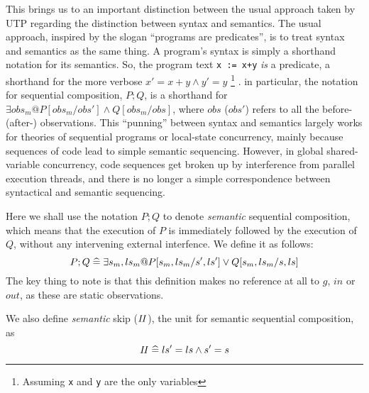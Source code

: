 This brings us to an important distinction between the usual approach
taken by UTP regarding the distinction between syntax and semantics.
The usual approach,
inspired by the slogan ``programs are predicates''\cite{predprog,conf/mlpl/Hoare85},
is to treat syntax and semantics as the same thing.
A program's syntax is simply a shorthand notation for its semantics.
So, the program text \texttt{x := x+y} \emph{is} a predicate,
a shorthand for the more verbose $x' = x + y \land y' = y$
\footnote{Assuming \texttt{x} and \texttt{y} are the only variables}
.
in particular, the notation for sequential composition, $P ; Q$,
is a shorthand for
$\exists obs_m @ P[obs_m/obs'] \land Q[obs_m/obs]$,
where $obs$ ($obs'$) refers to all the before- (after-) observations.
This ``punning'' between syntax and semantics largely works for theories
of sequential programs or local-state concurrency,
mainly because sequences of code lead to simple semantic sequencing.
However, in global shared-variable concurrency,
code sequences get broken up by interference from parallel execution threads,
and there is no longer a simple correspondence between syntactical and semantic
sequencing.

Here we shall use the notation $P;Q$
to denote \emph{semantic} sequential composition,
which means that the execution of $P$ is immediately followed by the
execution of $Q$, without any intervening external interfence.
We define it as follows:
\begin{equation}
   P ; Q \mathrel{\widehat=} \exists s_m, ls_m @ P[s_m,ls_m/s',ls'] \lor Q[s_m,ls_m/s,ls]
   \label{eqn:semantic-;}
\end{equation}
The key thing to note is that this definition makes no reference at all
to $g$, $in$ or $out$,
as these are static observations.

We also define \emph{semantic} skip ($\mathit{II}$),
the unit for semantic sequential composition,
as
\begin{equation}
  \mathit{II} \mathrel{\widehat=} ls' = ls \land s' = s
\end{equation}
